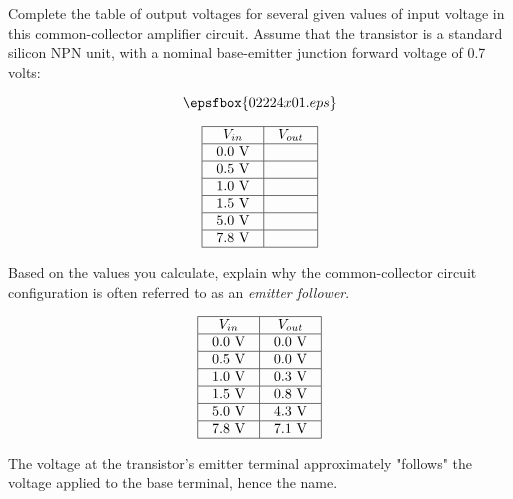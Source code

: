 

Complete the table of output voltages for several given values of input voltage in this common-collector amplifier circuit.  Assume that the transistor is a standard silicon NPN unit, with a nominal base-emitter junction forward voltage of 0.7 volts:

$$\epsfbox{02224x01.eps}$$


$$\vbox{\offinterlineskip
\halign{\strut
\vrule \quad\hfil # \ \hfil & 
\vrule \quad\hfil # \ \hfil \vrule \cr
\noalign{\hrule}
%
$V_{in}$ & $V_{out}$ \cr
%
\noalign{\hrule}
%
0.0 V &  \cr
%
\noalign{\hrule}
%
0.5 V &  \cr
%
\noalign{\hrule}
%
1.0 V &  \cr
%
\noalign{\hrule}
%
1.5 V &  \cr
%
\noalign{\hrule}
%
5.0 V &  \cr
%
\noalign{\hrule}
%
7.8 V &  \cr
%
\noalign{\hrule}
} %
}$$ %

Based on the values you calculate, explain why the common-collector circuit configuration is often referred to as an {\it emitter follower}.








$$\vbox{\offinterlineskip
\halign{\strut
\vrule \quad\hfil # \ \hfil & 
\vrule \quad\hfil # \ \hfil \vrule \cr
\noalign{\hrule}
%
$V_{in}$ & $V_{out}$ \cr
%
\noalign{\hrule}
%
0.0 V & 0.0 V \cr
%
\noalign{\hrule}
%
0.5 V & 0.0 V \cr
%
\noalign{\hrule}
%
1.0 V & 0.3 V \cr
%
\noalign{\hrule}
%
1.5 V & 0.8 V \cr
%
\noalign{\hrule}
%
5.0 V & 4.3 V \cr
%
\noalign{\hrule}
%
7.8 V & 7.1 V \cr
%
\noalign{\hrule}
} %
}$$ %

The voltage at the transistor's emitter terminal approximately "follows" the voltage applied to the base terminal, hence the name.

